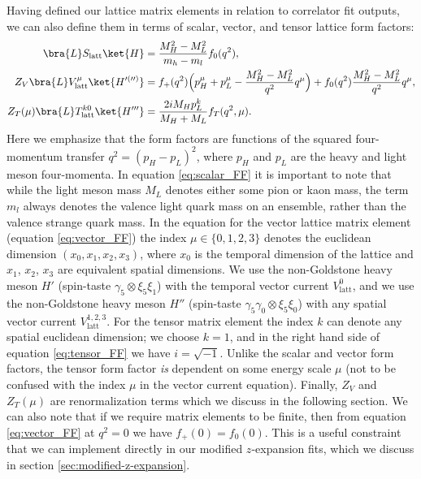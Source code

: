 Having defined our lattice matrix elements in relation to correlator fit outputs, we can also define them in terms of scalar, vector, and tensor lattice form factors:
\begin{align}\label{eq:scalar_FF}
  \bra{L}S_{\mathrm{latt}}\ket{H}&=\frac{M_{H}^2-M_{L}^2}{m_h-m_l}f_0(q^2),\\
\label{eq:vector_FF}
  Z_V\bra{L}V^{\mu}_{\mathrm{latt}}\ket{H^{\prime(\prime\prime)}}&=f_+(q^2)\Big(p_{H}^{\mu}+p_{L}^{\mu}-\frac{M_{H}^2-M_{L}^2}{q^2}q^{\mu}\Big)+f_0(q^2)\frac{M_{H}^2-M_{L}^2}{q^2}q^{\mu},\\
\label{eq:tensor_FF}
  Z_T(\mu)\bra{L}T^{k0}_{\mathrm{latt}}\ket{H'''}&=\frac{2iM_{H}p_L^k}{M_H+M_L}f_T(q^2,\mu).
\end{align}
Here we emphasize that the form factors are functions of the squared four-momentum transfer $q^2=(p_H-p_L)^2$, where $p_H$ and $p_L$ are the heavy and light meson four-momenta.  In equation \ref{eq:scalar_FF} it is important to note that while the light meson mass $M_L$ denotes either some pion or kaon mass, the term $m_l$ always denotes the valence light quark mass on an ensemble, rather than the valence strange quark mass. In the equation for the vector lattice matrix element (equation \ref{eq:vector_FF}) the index $\mu \in \{0,1,2,3\}$ denotes the euclidean dimension $(x_0,x_1,x_2,x_3)$, where $x_0$ is the temporal dimension of the lattice and $x_1$, $x_2$, $x_3$ are equivalent spatial dimensions. We use the non-Goldstone heavy meson $H'$ (spin-taste $\gamma_5 \otimes\xi_5\xi_1$) with the temporal vector current $V^{0}_\mathrm{latt}$, and we use the non-Goldstone heavy meson $H''$ (spin-taste $\gamma_5 \gamma_0\otimes\xi_5\xi_0$) with any spatial vector current $V^{1,2,3}_\mathrm{latt}$. For the tensor matrix element the index $k$ can denote any spatial euclidean dimension; we choose $k=1$, and in the right hand side of equation \ref{eq:tensor_FF} we have $i = \sqrt{-1}$.  Unlike the scalar and vector form factors, the tensor form factor \textit{is} dependent on some energy scale $\mu$ (not to be confused with the index $\mu$ in the vector current equation).  Finally, $Z_V$ and $Z_T(\mu)$ are renormalization terms which we discuss in the following section. We can also note that if we require matrix elements to be finite, then from equation \ref{eq:vector_FF} at $q^2=0$ we have $f_+(0) = f_0(0)$.  This is a useful constraint that we can implement directly in our modified $z$-expansion fits, which we discuss in section \ref{sec:modified-z-expansion}.


